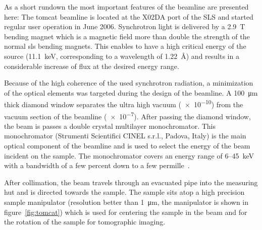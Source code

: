 As a short rundown the most important features of the beamline are presented here: The \ac{tomcat} beamline is located at the X02DA port of the SLS and started regular user operation in June 2006. Synchrotron light is delivered by a \SI{2.9}{\tesla} bending magnet which is a magnetic field more than double the strength of the normal \ac{sls} bending magnets. This enables to have a high critical energy of the source (\SI{11.1}{\kilo\electronvolt}, corresponding to a wavelength of \SI{1.22}{\angstrom}) and results in a considerable increase of flux at the desired energy range.

Because of the high coherence of the used synchrotron radiation, a minimization of the optical elements was targeted during the design of the beamline. A \SI{100}{\micro\meter} thick diamond window separates the ultra high vacuum (\SI{e-10}{\millibar}) from the vacuum section of the beamline (\SI{e-7}{\millibar}). After passing the diamond window, the beam is passes a double crystal multilayer monochromator. This monochromator (Strumenti Scientifici CINEL s.r.l., Padova, Italy) is the main optical component of the beamline and is used to select the energy of the beam incident on the sample. The monochromator covers an energy range of 6--\SI{45}{\kilo\electronvolt} with a bandwidth of a few percent down to a few permille~\cite{Stampanoni2006a}.

After collimation, the beam travels through an evacuated pipe into the measuring hut and is directed towards the sample. The sample sits atop a high precision sample manipulator (resolution better than \SI{1}{\micro\meter}, the manipulator is shown in figure~\ref{fig:tomcat}) which is used for centering the sample in the beam and for the rotation of the sample for tomographic imaging. 

